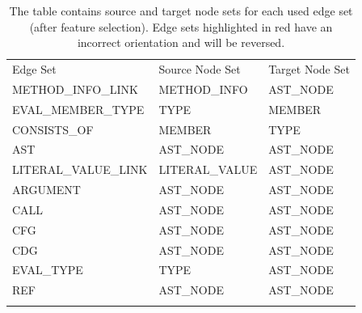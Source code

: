 \begin{table}
    \centering
    \caption{The table contains source and target node sets for each used edge set (after feature selection). Edge sets highlighted in red have an incorrect orientation and will be reversed.}
    \vskip6pt
	\begin{tabular}{
        !{\vrule width 1pt}l!{\vrule width 1pt}l|l!{\vrule width 1pt}}
        Edge Set & Source Node Set & Target Node Set \\

        METHOD\_INFO\_LINK & METHOD\_INFO & AST\_NODE \\ \hline
        EVAL\_MEMBER\_TYPE & TYPE & MEMBER \\ \hline
        CONSISTS\_OF & MEMBER & TYPE \\ \hline
        AST & AST\_NODE & AST\_NODE \\ \hline
        LITERAL\_VALUE\_LINK & LITERAL\_VALUE & AST\_NODE \\ \hline
        ARGUMENT & AST\_NODE & AST\_NODE \\ \hline
        CALL & AST\_NODE & AST\_NODE \\ \hline
        CFG & AST\_NODE & AST\_NODE \\ \hline
        CDG & AST\_NODE & AST\_NODE \\ \hline
        EVAL\_TYPE & TYPE & AST\_NODE \\ \hline
        REF & AST\_NODE & AST\_NODE \\ \hline
        
    \end{tabular}
    \label{tab:edge-sets-orientation}
\end{table}

